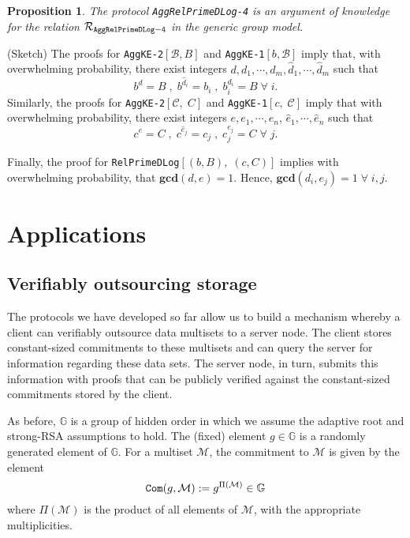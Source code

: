 \documentclass[11pt, lettersize, notitlepage, leqno, footskip=0.6cm]{article}
\newcommand{\mc}{\mathcal}
\newcommand{\mb}{\mathbb}
\newcommand{\mbf}{\mathbf}
\newcommand{\what}{\widehat}
\newcommand{\vs}{\vspace{-0.15cm}}
\newcommand{\op}{overwhelming probability}
\newcommand{\GCD}{\mbf{gcd}}
\newtheorem{Prop}[Thm]{Proposition}
\numberwithin{equation}{section}
\begin{document}
\begin{Prop} The protocol \verb|AggRelPrimeDLog-4| is an argument of knowledge for the relation $\mc{R}_{\tt{AggRelPrimeDLog-4}}$ in the generic group model.\end{Prop}

\begin{prf} (Sketch) The proofs for \verb|AggKE-2|$[\mc{B}, B]$ and \verb|AggKE-1|$[b,\mc{B}]$ imply that, with overwhelming probability, there exist integers $d,d_1,\cdots,d_m,\what{d}_1,\cdots,\what{d}_m$ such that \vs $$b^d = B\;,\; b^{\what{d}_i}= b_i\;,\; b_i^{d_i}= B\;\forall\; i.$$ Similarly, the proofs for \verb|AggKE-2|$[\mc{C},\; C]$ and \verb|AggKE-1|$[c,\;\mc{C}]$ imply that with overwhelming probability, there exist integers $e,e_1,\cdots,e_n$, $\what{e}_1,\cdots,\what{e}_n$ such that \vs $$c^e = C\;,\; c^{\what{e}_j}= c_j\;,\;c_j^{e_j}= C\;\forall\; j.$$ 

Finally, the proof for \verb|RelPrimeDLog|$[(b,B),\;(c,C)]$ implies with \op, that $\GCD(d,e) = 1$. Hence, $\GCD(d_i,e_j) = 1\;\forall\;i,j$.\end{prf}

\bigskip

\section{\fontsize{12}{12} Applications}

\subsection{\fontsize{11}{11} Verifiably outsourcing storage}

The protocols we have developed so far allow us to build a mechanism whereby a client can verifiably outsource data multisets to a server node. The client stores constant-sized commitments to these multisets and can query the server for information regarding these data sets. The server node, in turn, submits this information with proofs that can  be publicly verified against the constant-sized commitments stored by the client.

As before, $\mb{G}$ is a group of hidden order in which we assume the adaptive root and strong-RSA assumptions to hold. The (fixed) element $g\in\mb{G}$ is a randomly generated element of $\mb{G}$. For a multiset $\mc{M}$, the commitment to $\mc{M}$ is given by the element \vs $$\protect{\verb|Com|}(g, \mc{M}):= g^{\Pi(\mc{M})}\in\mb{G}$$ where $\Pi(\mc{M})$ is the product of all elements of $\mc{M}$, with the appropriate multiplicities. \vspace{0.15cm}
\end{document}
